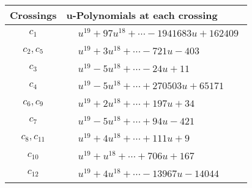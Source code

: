 \documentclass[1p]{elsarticle_modified}
\theoremstyle{definition}
\begin{document}
\begin{tabular}{m{50pt}|m{274pt}}
Crossings & \hspace{64pt}u-Polynomials at each crossing \\
\hline $$\begin{aligned}c_{1}\end{aligned}$$&$\begin{aligned}
&u^{19}+97 u^{18}+\cdots-1941683 u+162409
\end{aligned}$\\
\hline $$\begin{aligned}c_{2},c_{5}\end{aligned}$$&$\begin{aligned}
&u^{19}+3 u^{18}+\cdots-721 u-403
\end{aligned}$\\
\hline $$\begin{aligned}c_{3}\end{aligned}$$&$\begin{aligned}
&u^{19}-5 u^{18}+\cdots-24 u+11
\end{aligned}$\\
\hline $$\begin{aligned}c_{4}\end{aligned}$$&$\begin{aligned}
&u^{19}-5 u^{18}+\cdots+270503 u+65171
\end{aligned}$\\
\hline $$\begin{aligned}c_{6},c_{9}\end{aligned}$$&$\begin{aligned}
&u^{19}+2 u^{18}+\cdots+197 u+34
\end{aligned}$\\
\hline $$\begin{aligned}c_{7}\end{aligned}$$&$\begin{aligned}
&u^{19}-5 u^{18}+\cdots+94 u-421
\end{aligned}$\\
\hline $$\begin{aligned}c_{8},c_{11}\end{aligned}$$&$\begin{aligned}
&u^{19}+4 u^{18}+\cdots+111 u+9
\end{aligned}$\\
\hline $$\begin{aligned}c_{10}\end{aligned}$$&$\begin{aligned}
&u^{19}+u^{18}+\cdots+706 u+167
\end{aligned}$\\
\hline $$\begin{aligned}c_{12}\end{aligned}$$&$\begin{aligned}
&u^{19}+4 u^{18}+\cdots-13967 u-14044
\end{aligned}$\\
\hline
\end{tabular}\\~\\
\end{document}
